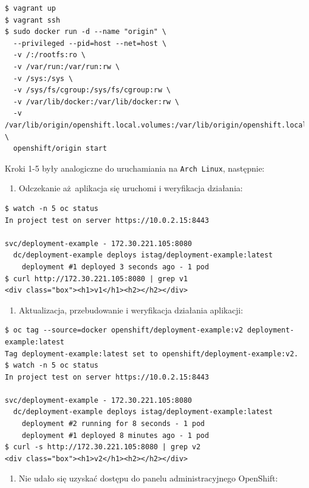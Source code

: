 \documentclass[a4paper,12pt,twoside,openany]{report}
\providecommand{\tightlist}{%
  \setlength{\itemsep}{0pt}\setlength{\parskip}{0pt}}
\newcommand{\passthrough}[1]{#1}
\begin{document}
\begin{lstlisting}
$ vagrant up
$ vagrant ssh
$ sudo docker run -d --name "origin" \
  --privileged --pid=host --net=host \
  -v /:/rootfs:ro \
  -v /var/run:/var/run:rw \
  -v /sys:/sys \
  -v /sys/fs/cgroup:/sys/fs/cgroup:rw \
  -v /var/lib/docker:/var/lib/docker:rw \
  -v /var/lib/origin/openshift.local.volumes:/var/lib/origin/openshift.local.volumes:rslave \
  openshift/origin start
\end{lstlisting}

Kroki 1-5 były analogiczne do uruchamiania na
\passthrough{\lstinline!Arch Linux!}, następnie:

\begin{enumerate}
\def\labelenumi{\arabic{enumi}.}
\setcounter{enumi}{5}
\tightlist
\item
  Odczekanie aż~aplikacja się uruchomi i weryfikacja działania:
\end{enumerate}

\begin{lstlisting}
$ watch -n 5 oc status
In project test on server https://10.0.2.15:8443

svc/deployment-example - 172.30.221.105:8080
  dc/deployment-example deploys istag/deployment-example:latest 
    deployment #1 deployed 3 seconds ago - 1 pod
$ curl http://172.30.221.105:8080 | grep v1
<div class="box"><h1>v1</h1><h2></h2></div>
\end{lstlisting}

\begin{enumerate}
\def\labelenumi{\arabic{enumi}.}
\setcounter{enumi}{6}
\tightlist
\item
  Aktualizacja, przebudowanie i weryfikacja działania aplikacji:
\end{enumerate}

\begin{lstlisting}
$ oc tag --source=docker openshift/deployment-example:v2 deployment-example:latest
Tag deployment-example:latest set to openshift/deployment-example:v2.
$ watch -n 5 oc status
In project test on server https://10.0.2.15:8443

svc/deployment-example - 172.30.221.105:8080
  dc/deployment-example deploys istag/deployment-example:latest 
    deployment #2 running for 8 seconds - 1 pod
    deployment #1 deployed 8 minutes ago - 1 pod
$ curl -s http://172.30.221.105:8080 | grep v2
<div class="box"><h1>v2</h1><h2></h2></div>
\end{lstlisting}

\begin{enumerate}
\def\labelenumi{\arabic{enumi}.}
\setcounter{enumi}{7}
\tightlist
\item
  Nie udało się uzyskać dostępu do panelu administracyjnego OpenShift:
\end{enumerate}
\end{document}
